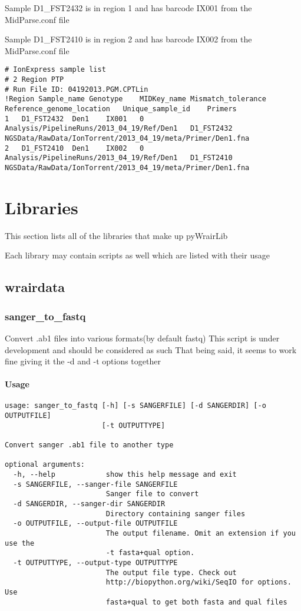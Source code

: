 \documentclass{article}
\begin{document}
Sample D1\_FST2432 is in region 1 and has barcode IX001 from the MidParse.conf file	

Sample D1\_FST2410 is in region 2 and has barcode IX002 from the MidParse.conf file	

\begin{landscape}
{\tiny
\begin{lstlisting}[basicstyle=\tiny]
# IonExpress sample list
# 2 Region PTP
# Run File ID: 04192013.PGM.CPTLin
!Region	Sample_name	Genotype	MIDKey_name	Mismatch_tolerance	Reference_genome_location	Unique_sample_id	Primers	
1	D1_FST2432	Den1	IX001	0	Analysis/PipelineRuns/2013_04_19/Ref/Den1	D1_FST2432	NGSData/RawData/IonTorrent/2013_04_19/meta/Primer/Den1.fna	
2	D1_FST2410	Den1	IX002	0	Analysis/PipelineRuns/2013_04_19/Ref/Den1	D1_FST2410	NGSData/RawData/IonTorrent/2013_04_19/meta/Primer/Den1.fna	
\end{lstlisting}
}
\end{landscape}

\section{Libraries}
This section lists all of the libraries that make up pyWrairLib

Each library may contain scripts as well which are listed with their usage

\subsection{wrairdata}

\subsubsection{sanger\_to\_fastq}
Convert .ab1 files into various formats(by default fastq)
This script is under development and should be considered as such
That being said, it seems to work fine giving it the -d and -t options together

\paragraph{Usage}

\begin{lstlisting}
usage: sanger_to_fastq [-h] [-s SANGERFILE] [-d SANGERDIR] [-o OUTPUTFILE]
                       [-t OUTPUTTYPE]

Convert sanger .ab1 file to another type

optional arguments:
  -h, --help            show this help message and exit
  -s SANGERFILE, --sanger-file SANGERFILE
                        Sanger file to convert
  -d SANGERDIR, --sanger-dir SANGERDIR
                        Directory containing sanger files
  -o OUTPUTFILE, --output-file OUTPUTFILE
                        The output filename. Omit an extension if you use the
                        -t fasta+qual option.
  -t OUTPUTTYPE, --output-type OUTPUTTYPE
                        The output file type. Check out
                        http://biopython.org/wiki/SeqIO for options. Use
                        fasta+qual to get both fasta and qual files
\end{lstlisting}
\end{document}
